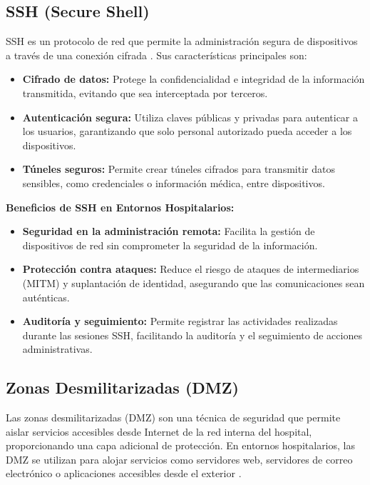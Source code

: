\subsection{SSH (Secure Shell)}
\label{subsec:ssh}
\acs{SSH} es un protocolo de red que permite la administración segura de dispositivos a través de una conexión cifrada \cite{cisco-hospital-design}. Sus características principales son:
\begin{itemize}
    \item \textbf{Cifrado de datos:} Protege la confidencialidad e integridad de la información transmitida, evitando que sea interceptada por terceros.
    \item \textbf{Autenticación segura:} Utiliza claves públicas y privadas para autenticar a los usuarios, garantizando que solo personal autorizado pueda acceder a los dispositivos.
    \item \textbf{Túneles seguros:} Permite crear túneles cifrados para transmitir datos sensibles, como credenciales o información médica, entre dispositivos.
\end{itemize}
\textbf{Beneficios de SSH en Entornos Hospitalarios:}
\begin{itemize}
    \item \textbf{Seguridad en la administración remota:} Facilita la gestión de dispositivos de red sin comprometer la seguridad de la información.
    \item \textbf{Protección contra ataques:} Reduce el riesgo de ataques de intermediarios (\acs{MITM}) y suplantación de identidad, asegurando que las comunicaciones sean auténticas.
    \item \textbf{Auditoría y seguimiento:} Permite registrar las actividades realizadas durante las sesiones \acs{SSH}, facilitando la auditoría y el seguimiento de acciones administrativas.
\end{itemize}

\subsection{Zonas Desmilitarizadas (DMZ)}
Las zonas desmilitarizadas (\acs{DMZ}) son una técnica de seguridad que permite aislar servicios accesibles desde Internet de la red interna del hospital, proporcionando una capa adicional de protección.
En entornos hospitalarios, las \acs{DMZ} se utilizan para alojar servicios como servidores web, servidores de correo electrónico o aplicaciones accesibles desde el exterior \cite{cisco-hospital-design}.

